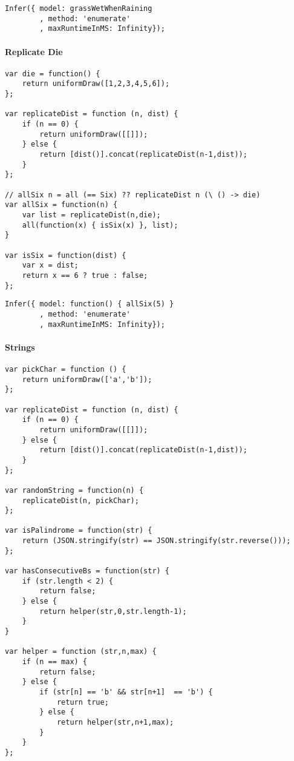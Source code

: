 \begin{verbatim}
Infer({ model: grassWetWhenRaining
        , method: 'enumerate'
        , maxRuntimeInMS: Infinity});
\end{verbatim}

\paragraph{Replicate Die}

\begin{verbatim}
var die = function() {
    return uniformDraw([1,2,3,4,5,6]);
};

var replicateDist = function (n, dist) {
    if (n == 0) {
        return uniformDraw([[]]);
    } else {
        return [dist()].concat(replicateDist(n-1,dist));
    }
};

// allSix n = all (== Six) ?? replicateDist n (\ () -> die)
var allSix = function(n) {
    var list = replicateDist(n,die);
    all(function(x) { isSix(x) }, list);
}

var isSix = function(dist) {
    var x = dist;
    return x == 6 ? true : false;
};

\end{verbatim}

\begin{verbatim}
Infer({ model: function() { allSix(5) }
        , method: 'enumerate'
        , maxRuntimeInMS: Infinity});
\end{verbatim}

\paragraph{Strings}

\begin{verbatim}
var pickChar = function () {
    return uniformDraw(['a','b']);
};

var replicateDist = function (n, dist) {
    if (n == 0) {
        return uniformDraw([[]]);
    } else {
        return [dist()].concat(replicateDist(n-1,dist));
    }
};

var randomString = function(n) {
    replicateDist(n, pickChar);
};

var isPalindrome = function(str) {
    return (JSON.stringify(str) == JSON.stringify(str.reverse()));
};

var hasConsecutiveBs = function(str) {
    if (str.length < 2) {
        return false;
    } else {
        return helper(str,0,str.length-1);
    }
}

var helper = function (str,n,max) {
    if (n == max) {
        return false;
    } else {
        if (str[n] == 'b' && str[n+1]  == 'b') {
            return true;
        } else {
            return helper(str,n+1,max);
        }
    }
};
\end{verbatim}

